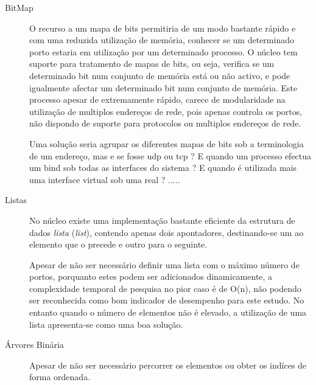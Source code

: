 \begin{description}

\item[BitMap]

O recurso a um mapa de bits permitiria de um modo bastante rápido e com uma reduzida utilização de memória, conhecer se um determinado porto estaria em utilização por um determinado processo.
O núcleo tem suporte para tratamento de mapas de bits, ou seja, verifica se um determinado bit num conjunto de memória está ou não activo, e pode igualmente afectar um determinado bit num conjunto de memória.
Este processo apesar de extremamente rápido, carece de modularidade na utilização de multiplos endereços de rede, pois apenas controla os portos, não dispondo de suporte para protocolos ou multiplos endereços de rede.
 
Uma solução seria agrupar os diferentes mapas de bits sob a terminologia de um endereço, mas e se fosse udp ou tcp ?
E quando um processo efectua um bind sob todas as interfaces do sistema ? 
E quando é utilizada mais uma interface virtual sob uma real ? .....


\item[Listas]

No núcleo existe uma implementação bastante eficiente da estrutura de dados \emph{lista} (\emph{list}), contendo apenas dois apontadores, destinando-se um ao elemento que o precede e outro para o seguinte.

Apesar de não ser necessário definir uma lista com o máximo número de portos, porquanto estes podem ser adicionados dinamicamente, a complexidade temporal de pesquisa no pior caso é de O(n), não podendo ser reconhecida como bom indicador de desempenho para este estudo.
No entanto quando o número de elementos não é elevado, a utilização de uma lista apresenta-se como uma boa solução.


\item[Árvores Binária]
Apesar de não ser necessário percorrer os elementos ou obter os indíces de forma ordenada. 


\end{description}
